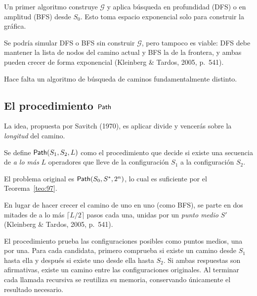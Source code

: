 \documentclass[11pt,letterpaper]{article}
\theoremstyle{plain}
\theoremstyle{definition}
\theoremstyle{remark}
\newcommand{\nombreMat}[1]{\ensuremath{\text{\fontencoding{OT1}\fontfamily{cmss}\upshape\selectfont #1}}}
\newcommand{\Path}{\nombreMat{Path}}
\begin{document}
Un primer algoritmo construye $\mathcal{G}$ y aplica
búsqueda en profundidad (DFS) o en amplitud (BFS)
desde $S_0$. Esto toma espacio exponencial solo
para construir la gráfica.

Se podría simular DFS o BFS sin construir
$\mathcal{G}$, pero tampoco es viable: DFS debe
mantener la lista de nodos del camino actual y
BFS la de la frontera, y ambas pueden crecer de
forma exponencial
(Kleinberg \& Tardos, 2005, p.~541).

Hace falta un algoritmo de búsqueda de caminos
fundamentalmente distinto.

\subsection{El procedimiento \Path}\label{sec:path}

La idea, propuesta por Savitch (1970), es aplicar
divide y vencerás sobre la \emph{longitud} del camino.

Se define $\Path(S_1,S_2,L)$ como el procedimiento
que decide si existe una secuencia de \emph{a lo más}
$L$ operadores que lleve de la configuración $S_1$
a la configuración $S_2$.

El problema original es
$\Path(S_0,S^{*},2^{n})$, lo cual es suficiente
por el Teorema~\ref{teo:97}.

En lugar de hacer crecer el camino de uno en uno
(como BFS), se parte en dos mitades de a lo más
$\lceil L/2\rceil$ pasos cada una, unidas por un
\emph{punto medio} $S'$
(Kleinberg \& Tardos, 2005, p.~541).


El procedimiento prueba las configuraciones posibles
como puntos medios, una por una. Para cada candidata,
primero comprueba si existe un camino desde $S_1$
hasta ella y después si existe uno desde ella hasta
$S_2$. Si ambas respuestas son afirmativas, existe
un camino entre las configuraciones originales.
Al terminar cada llamada recursiva se reutiliza su
memoria, conservando únicamente el resultado necesario.
\end{document}
